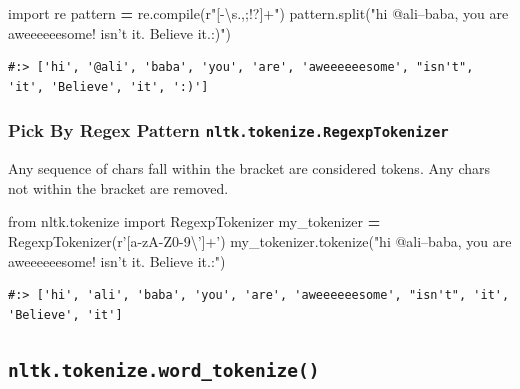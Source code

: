 \documentclass[
]{book}
\newenvironment{Shaded}{\begin{snugshade}}{\end{snugshade}}
\newcommand{\BuiltInTok}[1]{#1}
\newcommand{\ImportTok}[1]{#1}
\newcommand{\NormalTok}[1]{#1}
\newcommand{\OperatorTok}[1]{\textcolor[rgb]{0.43,0.43,0.43}{\textbf{#1}}}
\newcommand{\StringTok}[1]{\textcolor[rgb]{0.5,0.5,0.5}{#1}}
\newcommand{\VerbatimStringTok}[1]{\textcolor[rgb]{0.5,0.5,0.5}{#1}}
\begin{document}
\begin{Shaded}
\begin{Highlighting}[]
\ImportTok{import}\NormalTok{ re}
\NormalTok{pattern }\OperatorTok{=}\NormalTok{ re.}\BuiltInTok{compile}\NormalTok{(}\VerbatimStringTok{r"[-\textbackslash{}s.,;!?]+"}\NormalTok{)}
\NormalTok{pattern.split(}\StringTok{"hi @ali--baba, you are aweeeeeesome! isn't it. Believe it.:)"}\NormalTok{)}
\end{Highlighting}
\end{Shaded}

\begin{verbatim}
#:> ['hi', '@ali', 'baba', 'you', 'are', 'aweeeeeesome', "isn't", 'it', 'Believe', 'it', ':)']
\end{verbatim}

\hypertarget{pick-by-regex-pattern-nltk.tokenize.regexptokenizer}{%
\subsubsection{\texorpdfstring{Pick By Regex Pattern \texttt{nltk.tokenize.RegexpTokenizer}}{Pick By Regex Pattern nltk.tokenize.RegexpTokenizer}}\label{pick-by-regex-pattern-nltk.tokenize.regexptokenizer}}

Any sequence of chars fall within the bracket are considered tokens. Any chars not within the bracket are removed.

\begin{Shaded}
\begin{Highlighting}[]
\ImportTok{from}\NormalTok{ nltk.tokenize }\ImportTok{import}\NormalTok{ RegexpTokenizer}
\NormalTok{my_tokenizer }\OperatorTok{=}\NormalTok{ RegexpTokenizer(}\VerbatimStringTok{r'[a-zA-Z0-9\textbackslash{}']+'}\NormalTok{)}
\NormalTok{my_tokenizer.tokenize(}\StringTok{"hi @ali--baba, you are aweeeeeesome! isn't it. Believe it.:"}\NormalTok{)}
\end{Highlighting}
\end{Shaded}

\begin{verbatim}
#:> ['hi', 'ali', 'baba', 'you', 'are', 'aweeeeeesome', "isn't", 'it', 'Believe', 'it']
\end{verbatim}

\hypertarget{nltk.tokenize.word_tokenize}{%
\subsection{\texorpdfstring{\texttt{nltk.tokenize.word\_tokenize()}}{nltk.tokenize.word\_tokenize()}}\label{nltk.tokenize.word_tokenize}}
\end{document}
